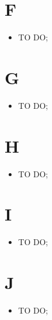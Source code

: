 %


\section*{F} %
\label{sec:f}
	\begin{itemize}
		\item TO DO;
	\end{itemize}

\section*{G} %
\label{sec:g}
	\begin{itemize}
		\item TO DO;
	\end{itemize}

\section*{H} %
\label{sec:h}
	\begin{itemize}
		\item TO DO;
	\end{itemize}

\section*{I} %
\label{sec:i}
	\begin{itemize}
		\item TO DO;
	\end{itemize}

\section*{J} %
\label{sec:j}
	\begin{itemize}
		\item TO DO;
	\end{itemize}
